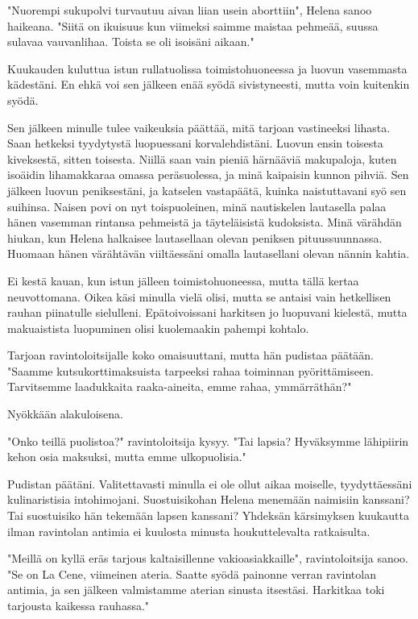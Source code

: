 "Nuorempi sukupolvi turvautuu aivan liian usein aborttiin", Helena sanoo haikeana. "Siitä on ikuisuus kun viimeksi saimme maistaa pehmeää, suussa sulavaa vauvanlihaa. Toista se oli isoisäni aikaan."


Kuukauden kuluttua istun rullatuolissa toimistohuoneessa ja luovun vasemmasta kädestäni. En ehkä voi sen jälkeen enää syödä sivistyneesti, mutta voin kuitenkin syödä.


Sen jälkeen minulle tulee vaikeuksia päättää, mitä tarjoan vastineeksi lihasta. Saan hetkeksi tyydytystä luopuessani korvalehdistäni. Luovun ensin toisesta kiveksestä, sitten toisesta. Niillä saan vain pieniä härnääviä makupaloja, kuten isoäidin lihamakkaraa omassa peräsuolessa, ja minä kaipaisin kunnon pihviä. Sen jälkeen luovun peniksestäni, ja katselen vastapäätä, kuinka naistuttavani syö sen suihinsa. Naisen povi on nyt toispuoleinen, minä nautiskelen lautasella palaa hänen vasemman rintansa pehmeistä ja täyteläisistä kudoksista. Minä värähdän hiukan, kun Helena halkaisee lautasellaan olevan peniksen pituussuunnassa. Huomaan hänen värähtävän viiltäessäni omalla lautasellani olevan nännin kahtia.


Ei kestä kauan, kun istun jälleen toimistohuoneessa, mutta tällä kertaa neuvottomana. Oikea käsi minulla vielä olisi, mutta se antaisi vain hetkellisen rauhan piinatulle sielulleni. Epätoivoissani harkitsen jo luopuvani kielestä, mutta makuaistista luopuminen olisi kuolemaakin pahempi kohtalo.


Tarjoan ravintoloitsijalle koko omaisuuttani, mutta hän pudistaa päätään. "Saamme kutsukorttimaksuista tarpeeksi rahaa toiminnan pyörittämiseen. Tarvitsemme laadukkaita raaka-aineita, emme rahaa, ymmärräthän?"


Nyökkään alakuloisena.


"Onko teillä puolistoa?" ravintoloitsija kysyy. "Tai lapsia? Hyväksymme lähipiirin kehon osia maksuksi, mutta emme ulkopuolisia."


Pudistan päätäni. Valitettavasti minulla ei ole ollut aikaa moiselle, tyydyttäessäni kulinaristisia intohimojani. Suostuisikohan Helena menemään naimisiin kanssani? Tai suostuisiko hän tekemään lapsen kanssani? Yhdeksän kärsimyksen kuukautta ilman ravintolan antimia ei kuulosta minusta houkuttelevalta ratkaisulta.


"Meillä on kyllä eräs tarjous kaltaisillenne vakioasiakkaille", ravintoloitsija sanoo. "Se on La Cene, viimeinen ateria. Saatte syödä painonne verran ravintolan antimia, ja sen jälkeen valmistamme aterian sinusta itsestäsi. Harkitkaa toki tarjousta kaikessa rauhassa."


